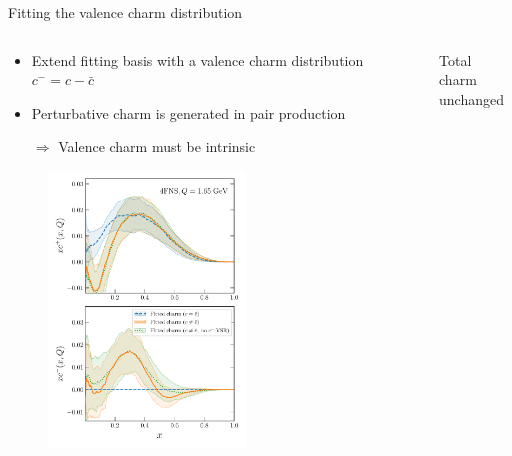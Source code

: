 \documentclass[aspectratio=43, 8pt,t]{beamer}
\begin{document}
\begin{frame}{Fitting the valence charm distribution}
  \begin{columns}
    \begin{column}{0.49\columnwidth}
      \begin{itemize}
        \item Extend fitting basis with a valence charm distribution $c^-=c-\bar{c}$
        \item Perturbative charm is generated in pair production
        \item[$\Rightarrow$] Valence charm must be intrinsic
      \end{itemize}
      \begin{figure}
        \includegraphics[width=0.6\textwidth]{CharmAsymmetry-q1p65gev-Fig1Main-noVSR.pdf}
      \end{figure}
    \end{column}
    \begin{column}{0.49\columnwidth}
      Total charm unchanged
    \end{column}
  \end{columns}
\end{frame}
\end{document}
